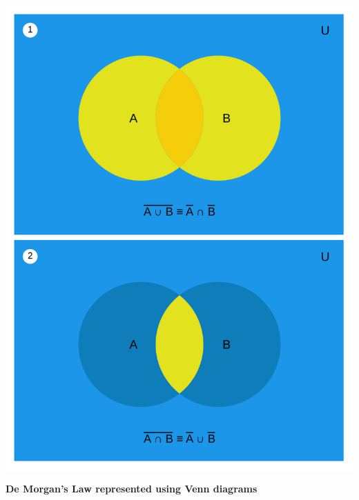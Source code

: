 \begin{center}
    \includegraphics[scale = 0.16]{Documents/800px-Demorganlaws.svg.png}
\end{center}
\begin{center}
    \textbf{De Morgan's Law represented using Venn diagrams}
\end{center}
\clearpage
